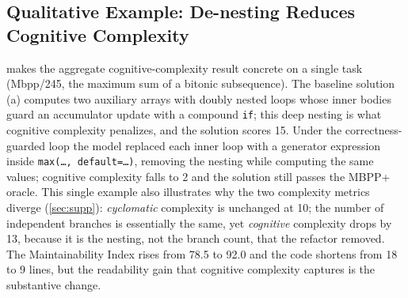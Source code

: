 \subsection{Qualitative Example: De-nesting Reduces Cognitive Complexity}
\label{sec:example}
 makes the aggregate cognitive-complexity result concrete on a
single task (Mbpp/245, the maximum sum of a bitonic subsequence). The baseline
solution (a) computes two auxiliary arrays with doubly nested loops whose inner
bodies guard an accumulator update with a compound \texttt{if}; this deep nesting
is what cognitive complexity penalizes, and the solution scores 15. Under the
correctness-guarded loop the model replaced each inner loop with a generator
expression inside \texttt{max(\dots, default=\dots)}, removing the nesting while
computing the same values; cognitive complexity falls to 2 and the solution still
passes the MBPP+ oracle. This single example also illustrates why the two
complexity metrics diverge (\cref{sec:supp}): \emph{cyclomatic} complexity is unchanged at 10; the number of
independent branches is essentially the same, yet \emph{cognitive} complexity drops by 13, because it is the nesting, not the branch
count, that the refactor removed. The Maintainability Index rises from 78.5 to
92.0 and the code shortens from 18 to 9 lines, but the readability gain that
cognitive complexity captures is the substantive change.

